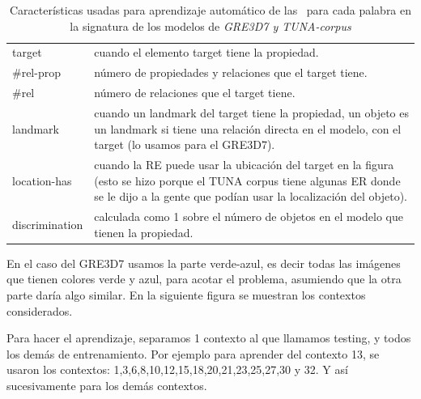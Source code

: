 \begin{small}
\begin{table}[h]
\begin{center}
\begin{tabular}{|l|p{10cm}|}
\hline
target & cuando el elemento target tiene la propiedad. \\
\#rel-prop & n\'umero de propiedades y relaciones que el target tiene.\\
\#rel & n\'umero de relaciones que el target tiene. \\
landmark & cuando un landmark del target tiene la propiedad, un objeto es un landmark si tiene una relaci\'on directa en el modelo, con el target (lo usamos para el GRE3D7).\\
location-has & cuando la RE puede usar la ubicaci\'on del target en la figura (esto se hizo porque el TUNA corpus tiene algunas ER donde se le dijo a la gente que pod\'ian usar la localizaci\'on del objeto).\\
discrimination & calculada como 1 sobre el n\'umero de objetos en el modelo que tienen la propiedad.  \\
\hline
\end{tabular}
\caption{Caracter\'isticas usadas para aprendizaje autom\'atico de las \puse~para cada palabra en la signatura de los modelos de \textit{GRE3D7 y TUNA-corpus} \label{features}}
\end{center}
\end{table}
\end{small}


En el caso del GRE3D7 usamos la parte verde-azul, es decir todas las im\'agenes que tienen colores verde y azul, para acotar el problema, asumiendo que la otra parte dar\'ia algo similar. En la siguiente figura se muestran los contextos considerados.


Para hacer el aprendizaje, separamos 1 contexto al que llamamos testing, y todos los dem\'as de entrenamiento. Por ejemplo para aprender \puse del contexto 13, se usaron los contextos: 1,3,6,8,10,12,15,18,20,21,23,25,27,30 y 32. Y as\'i sucesivamente para los dem\'as contextos.

